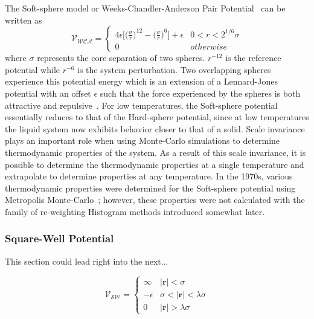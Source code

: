 \documentclass[letterpaper,twocolumn,amsmath,amssymb,pre,aps,10pt]{revtex4-1}
\begin{document}
The Soft-sphere model or Weeks-Chandler-Anderson Pair Potential~\cite{andersen1971relationship, weeks1971role} can be written as
\begin{equation}
	\mathcal{V}_{\mathcal{WCA}}=\begin{cases}4\epsilon \bigg[\bigg(\frac{\sigma}{r}\bigg)^{12}-\bigg(\frac{\sigma}{r}\bigg)^{6}\bigg]+\epsilon & 0 < r<2^{1/6}\sigma\\0 & otherwise\end{cases} 
\end{equation}
where $\sigma$ represents the core separation of two spheres.  $r^{-12}$ is the reference potential while $r^{-6}$ is the system perturbation.  Two overlapping spheres experience this potential energy which is an extension of a Lennard-Jones potential with an offset $\epsilon$ such that the force experienced by the spheres is both attractive and repulsive~\cite{hoover1970soft}.  For low temperatures, the Soft-sphere potential essentially reduces to that of the Hard-sphere potential, since at low temperatures the liquid system now exhibits behavior closer to that of a solid.
Scale invariance plays an important role when using Monte-Carlo simulations to determine thermodynamic properties of the system. As a result of this scale invariance, it is possible to determine the thermodynamic properties at a single temperature and extrapolate to determine properties at any temperature.  In the 1970s, various thermodynamic properties were determined for the Soft-sphere potential using Metropolis Monte-Carlo~\cite{andersen1971relationship, hansen1970phase}; however, these properties were not calculated with the family of re-weighting Histogram methods introduced somewhat later.

\subsubsection{Square-Well Potential}

This section could lead right into the next...

\begin{equation}
 \mathcal{V}_{\mathcal{SW}}=\begin{cases} \infty & \lvert\textbf{r}\rvert< \sigma\\-\epsilon & \sigma<\lvert\textbf{r}\rvert<\lambda\sigma\\0 & \lvert\textbf{r}\rvert > \lambda\sigma\end{cases}
\end{equation}
\end{document}
